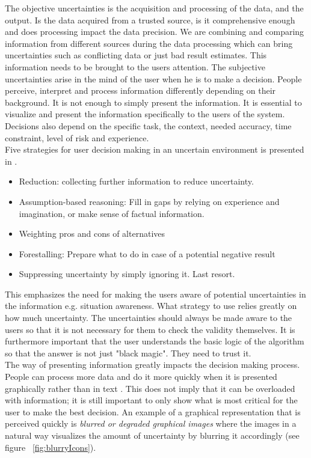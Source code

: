 The objective uncertainties is the acquisition and processing of the data, and the output. Is the data acquired from a trusted source, is it comprehensive enough and does processing impact the data precision. We are combining and comparing information from different sources during the data processing which can bring uncertainties such as conflicting data or just bad result estimates. This information needs to be brought to the users attention. The subjective uncertainties arise in the mind of the user when he is to make a decision. People perceive, interpret and process information differently depending on their background. It is not enough to simply present the information. It is essential to visualize and present the information specifically to the users of the system. Decisions also depend on the specific task, the context, needed accuracy, time constraint, level of risk and experience. 
\\[0.5cm]
Five strategies for user decision making in an uncertain environment is presented in \cite{UncertainInformation}. 
\begin{itemize}
\item Reduction: collecting further information to reduce uncertainty.
\item Assumption-based reasoning: Fill in gaps by relying on experience and imagination, or make sense of factual information.
\item Weighting pros and cons of alternatives
\item Forestalling: Prepare what to do in case of a potential negative result
\item Suppressing uncertainty by simply ignoring it. Last resort.
\end{itemize}  
This emphasizes the need for making the users aware of potential uncertainties in the information e.g. situation awareness. What strategy to use relies greatly on how much uncertainty. The uncertainties should always be made aware to the users so that it is not necessary for them to check the validity themselves. It is furthermore important that the user understands the basic logic of the algorithm so that the answer is not just "black magic". They need to trust it.
\\[0.5cm]
The way of presenting information greatly impacts the decision making process. People can process more data and do it more quickly when it is presented graphically rather than in text \cite{UncertainInformation}. This does not imply that it can be overloaded with information; it is still important to only show what is most critical for the user to make the best decision. An example of a graphical representation that is perceived quickly is \textit{blurred or degraded graphical images} where the images in a natural way visualizes the amount of uncertainty by blurring it accordingly (see figure ~\ref{fig:blurryIcons}). 

